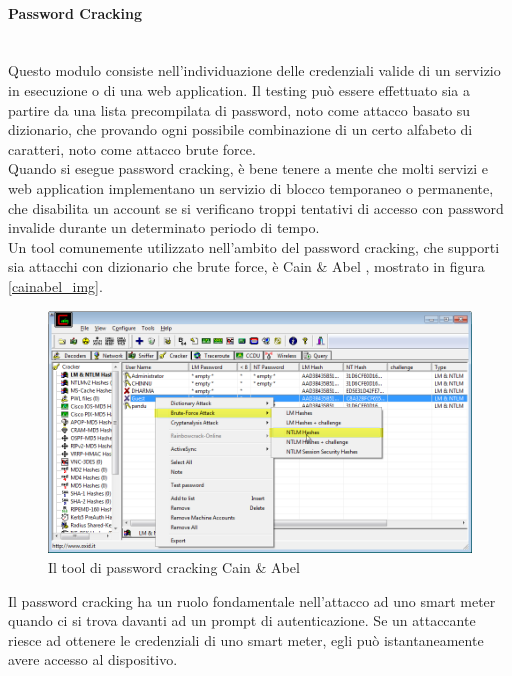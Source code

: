 \paragraph{Password Cracking}\mbox{}\\
Questo modulo consiste nell'individuazione delle credenziali valide di un servizio in esecuzione o di una web application. Il testing può essere effettuato sia a partire da una lista precompilata di password, noto come attacco basato su dizionario, che provando ogni possibile combinazione di un certo alfabeto di caratteri, noto come attacco brute force.\\
Quando si esegue password cracking, è bene tenere a mente che molti servizi e web application implementano un servizio di blocco temporaneo o permanente, che disabilita un account se si verificano troppi tentativi di accesso con password invalide durante un determinato periodo di tempo.\\
Un tool comunemente utilizzato nell'ambito del password cracking, che supporti sia attacchi con dizionario che brute force, è Cain \& Abel \cite{cainabel}, mostrato in figura \ref{cainabel_img}.\\
\begin{figure}[hbtp]
	\centering
	\includegraphics[scale=.3]{imgs/attack/cainabel.png}
	\caption{Il tool di password cracking Cain \& Abel}
	\label{cainable_img}
\end{figure}
Il password cracking ha un ruolo fondamentale nell'attacco ad uno smart meter quando ci si trova davanti ad un prompt di autenticazione. Se un attaccante riesce ad ottenere le credenziali di uno smart meter, egli può istantaneamente avere accesso al dispositivo.

